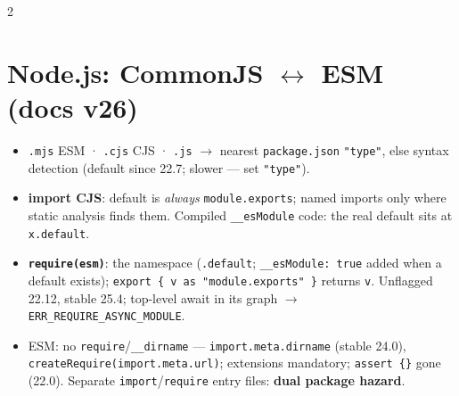 \documentclass[8pt]{extarticle}
\newcommand\ct[1]{\texttt{#1}}
\begin{document}
\begin{multicols}{2}
\section{Node.js: CommonJS $\leftrightarrow$ ESM (docs v26)}
\begin{itemize}
  \item \ct{.mjs} ESM · \ct{.cjs} CJS · \ct{.js} $\to$ nearest \ct{package.json}
        \ct{"type"}, else syntax detection (default since 22.7; slower — set \ct{"type"}).
  \item \textbf{import CJS}: default is \emph{always} \ct{module.exports}; named imports only
        where static analysis finds them. Compiled \ct{\_\_esModule} code: the real default
        sits at \ct{x.default}.
  \item \textbf{\ct{require(esm)}}: the namespace (\ct{.default}; \ct{\_\_esModule: true} added
        when a default exists); \ct{export \{ v as "module.exports" \}} returns \ct{v}. Unflagged
        22.12, stable 25.4; top-level await in its graph $\to$ \ct{ERR\_REQUIRE\_ASYNC\_MODULE}.
  \item ESM: no \ct{require}/\ct{\_\_dirname} — \ct{import.meta.dirname} (stable 24.0),
        \ct{createRequire(import.meta.url)}; extensions mandatory; \ct{assert \{\}} gone (22.0).
        Separate \ct{import}/\ct{require} entry files: \textbf{dual package hazard}.
\end{itemize}

\end{multicols}

\end{document}
